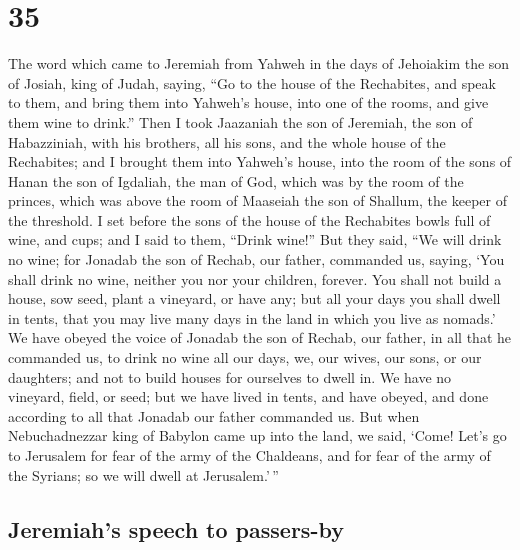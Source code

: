 \hypertarget{section-34}{%
\section{35}\label{section-34}}

 The word which came to Jeremiah from Yahweh in the days
of Jehoiakim the son of Josiah, king of Judah, saying, 
``Go to the house of the Rechabites, and speak to them, and bring them
into Yahweh's house, into one of the rooms, and give them wine to
drink.''  Then I took Jaazaniah the son of Jeremiah, the
son of Habazziniah, with his brothers, all his sons, and the whole house
of the Rechabites;  and I brought them into Yahweh's
house, into the room of the sons of Hanan the son of Igdaliah, the man
of God, which was by the room of the princes, which was above the room
of Maaseiah the son of Shallum, the keeper of the threshold.
 I set before the sons of the house of the Rechabites
bowls full of wine, and cups; and I said to them, ``Drink wine!''
 But they said, ``We will drink no wine; for Jonadab the
son of Rechab, our father, commanded us, saying, `You shall drink no
wine, neither you nor your children, forever.  You shall
not build a house, sow seed, plant a vineyard, or have any; but all your
days you shall dwell in tents, that you may live many days in the land
in which you live as nomads.'  We have obeyed the voice of
Jonadab the son of Rechab, our father, in all that he commanded us, to
drink no wine all our days, we, our wives, our sons, or our daughters;
 and not to build houses for ourselves to dwell in. We
have no vineyard, field, or seed;  but we have lived in
tents, and have obeyed, and done according to all that Jonadab our
father commanded us.  But when Nebuchadnezzar king of
Babylon came up into the land, we said, `Come! Let's go to Jerusalem for
fear of the army of the Chaldeans, and for fear of the army of the
Syrians; so we will dwell at Jerusalem.'\,''

\hypertarget{jeremiahs-speech-to-passers-by}{%
\subsection{Jeremiah's speech to
passers-by}\label{jeremiahs-speech-to-passers-by}}

